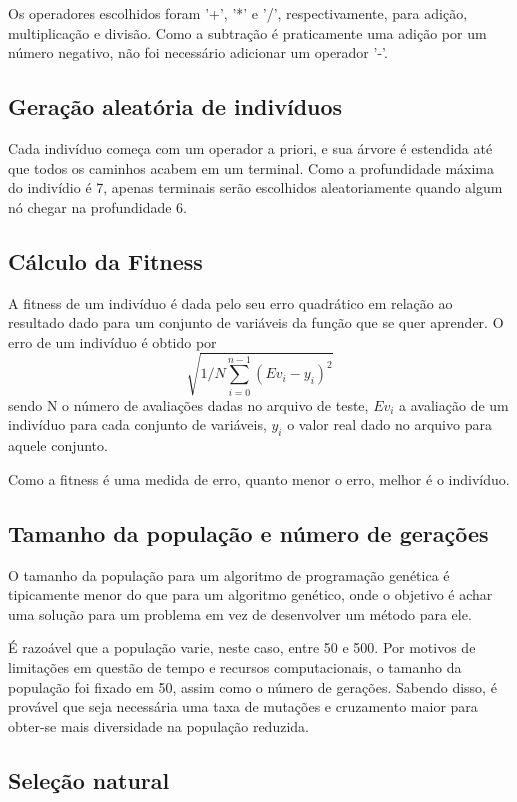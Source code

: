 \documentclass[11pt]{article}
\begin{document}
Os operadores escolhidos foram '+', '*' e '/', respectivamente, para adição, multiplicação e divisão. Como a subtração é praticamente uma adição por um número negativo, não foi necessário adicionar um operador '-'. 

\subsection*{Geração aleatória de indivíduos}

Cada indivíduo começa com um operador a priori, e sua árvore é estendida até que todos os caminhos acabem em um terminal. Como a profundidade máxima do indivídio é 7, apenas terminais serão escolhidos aleatoriamente quando algum nó chegar na profundidade 6.

\subsection*{Cálculo da Fitness}

A fitness de um indivíduo é dada pelo seu erro quadrático em relação ao resultado dado para um conjunto de variáveis da função que se quer aprender. O erro de um indivíduo é obtido por $$\sqrt{1/N\sum\limits_{i=0}^{n-1} (Ev_i - y_i)^2}$$ sendo N o número de avaliações dadas no arquivo de teste, $Ev_i$ a avaliação de um indivíduo para cada conjunto de variáveis, $y_i$ o valor real dado no arquivo para aquele conjunto.

Como a fitness é uma medida de erro, quanto menor o erro, melhor é o indivíduo.

\subsection*{Tamanho da população e número de gerações}

O tamanho da população para um algoritmo de programação genética é tipicamente menor do que para um algoritmo genético, onde o objetivo é achar uma solução para um problema em vez de desenvolver um método para ele.

É razoável que a população varie, neste caso, entre 50 e 500. Por motivos de limitações em questão de tempo e recursos computacionais, o tamanho da população foi fixado em 50, assim como o número de gerações. Sabendo disso, é provável que seja necessária uma taxa de mutações e cruzamento maior para obter-se mais diversidade na população reduzida.

\subsection*{Seleção natural}
\end{document}
